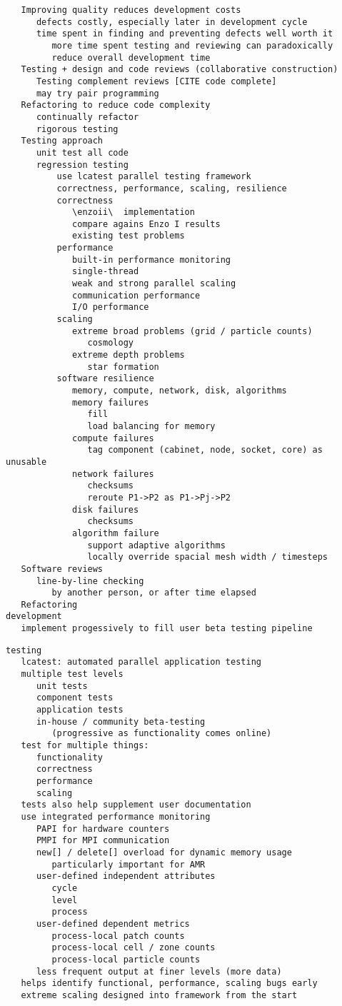 \documentclass{article}
\begin{document}
\begin{verbatim}
   Improving quality reduces development costs
      defects costly, especially later in development cycle
      time spent in finding and preventing defects well worth it
         more time spent testing and reviewing can paradoxically
         reduce overall development time
   Testing + design and code reviews (collaborative construction)
      Testing complement reviews [CITE code complete]
      may try pair programming
   Refactoring to reduce code complexity
      continually refactor
      rigorous testing
   Testing approach
      unit test all code
      regression testing
          use lcatest parallel testing framework
          correctness, performance, scaling, resilience
          correctness
             \enzoii\  implementation
             compare agains Enzo I results
             existing test problems
          performance
             built-in performance monitoring
             single-thread
             weak and strong parallel scaling 
             communication performance
             I/O performance
          scaling
             extreme broad problems (grid / particle counts)
                cosmology
             extreme depth problems
                star formation
          software resilience
             memory, compute, network, disk, algorithms
             memory failures
                fill
                load balancing for memory
             compute failures
                tag component (cabinet, node, socket, core) as unusable
             network failures
                checksums
                reroute P1->P2 as P1->Pj->P2
             disk failures
                checksums
             algorithm failure
                support adaptive algorithms
                locally override spacial mesh width / timesteps
   Software reviews
      line-by-line checking
         by another person, or after time elapsed
   Refactoring
development
   implement progessively to fill user beta testing pipeline
\end{verbatim}

\begin{verbatim}
testing
   lcatest: automated parallel application testing
   multiple test levels
      unit tests
      component tests
      application tests
      in-house / community beta-testing
         (progressive as functionality comes online)
   test for multiple things:
      functionality
      correctness
      performance
      scaling
   tests also help supplement user documentation
   use integrated performance monitoring
      PAPI for hardware counters
      PMPI for MPI communication
      new[] / delete[] overload for dynamic memory usage
         particularly important for AMR
      user-defined independent attributes
         cycle
         level
         process
      user-defined dependent metrics
         process-local patch counts
         process-local cell / zone counts
         process-local particle counts
      less frequent output at finer levels (more data)
   helps identify functional, performance, scaling bugs early
   extreme scaling designed into framework from the start
\end{verbatim}
\end{document}
